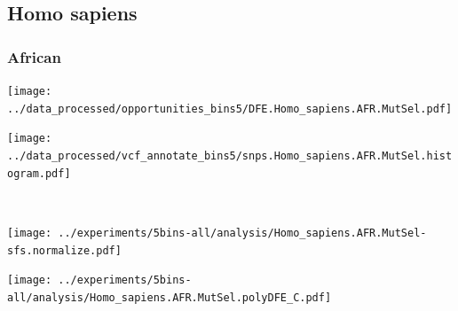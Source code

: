 \subsection{Homo sapiens}

\subsubsection{African}

\begin{minipage}{0.49\linewidth}
    \texttt{[image: ../data\_processed/opportunities\_bins5/DFE.Homo\_sapiens.AFR.MutSel.pdf]}
\end{minipage}
\begin{minipage}{0.49\linewidth}
    \texttt{[image: ../data\_processed/vcf\_annotate\_bins5/snps.Homo\_sapiens.AFR.MutSel.histogram.pdf]}
\end{minipage}
\\
\begin{minipage}{0.49\linewidth}
    \texttt{[image: ../experiments/5bins-all/analysis/Homo\_sapiens.AFR.MutSel-sfs.normalize.pdf]}
\end{minipage}
\begin{minipage}{0.4\linewidth}
    \texttt{[image: ../experiments/5bins-all/analysis/Homo\_sapiens.AFR.MutSel.polyDFE\_C.pdf]}
\end{minipage}
